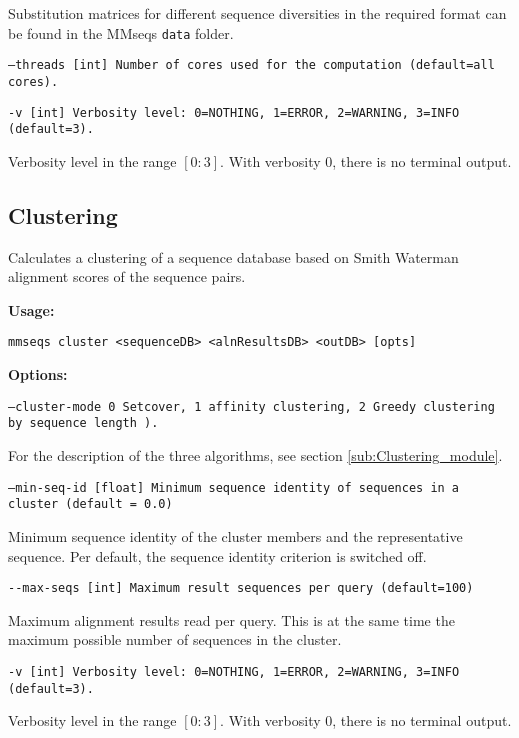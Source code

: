 \documentclass[11pt,a4paper]{report}
\begin{document}
Substitution matrices for different sequence diversities in the required
format can be found in the MMseqs \texttt{data} folder.

\texttt{\small --threads {[}int{]} Number of cores used for the computation
(default=all cores).}{\small \par}

\texttt{\small -v {[}int{]} Verbosity level: 0=NOTHING, 1=ERROR, 2=WARNING,
3=INFO (default=3).}{\small \par}

Verbosity level in the range $[0:3]$. With verbosity $0$, there
is no terminal output.


\subsection{Clustering}

Calculates a clustering of a sequence database based on Smith Waterman
alignment scores of the sequence pairs.

\textbf{Usage:}

\texttt{mmseqs cluster <sequenceDB> <alnResultsDB> <outDB> {[}opts{]}}

\textbf{Options:}

\texttt{\small --cluster-mode 0 Setcover, 1 affinity clustering, 2 Greedy clustering by sequence length
).}{\small \par}

For the description of the three algorithms, see section \ref{sub:Clustering_module}.

\texttt{\small --min-seq-id {[}float{]} Minimum sequence identity of sequences
in a cluster (default = 0.0)}{\small \par}

Minimum sequence identity of the cluster members and the representative
sequence. Per default, the sequence identity criterion is switched
off.

\texttt{\small -{}-max-seqs {[}int{]} Maximum result sequences per
query (default=100)}{\small \par}

Maximum alignment results read per query. This is at the same time
the maximum possible number of sequences in the cluster.

\texttt{\small -v {[}int{]} Verbosity level: 0=NOTHING, 1=ERROR, 2=WARNING,
3=INFO (default=3).}{\small \par}

Verbosity level in the range $[0:3]$. With verbosity $0$, there
is no terminal output.
\end{document}
